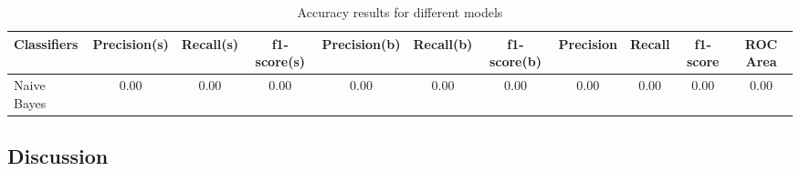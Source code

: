 \begin{table*}[t]
\centering 
\caption{Accuracy results for different models} 
\begin{tabular}{|l|ccc|ccc|cccc|} 
\hline 
Classifiers & Precision(s) & Recall(s) & f1-score(s) & Precision(b) & Recall(b) & f1-score(b) & Precision & Recall & f1-score & ROC Area \\
\hline
Naive Bayes & 0.00 & 0.00 & 0.00 & 0.00 & 0.00 & 0.00 & 0.00 & 0.00 & 0.00 & 0.00 
\end{tabular}
\label{tab:AI-Summary} 
\end{table*}

\subsection{Discussion}

